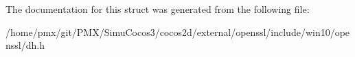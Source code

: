The documentation for this struct was generated from the following file\+:\begin{DoxyCompactItemize}
\item 
/home/pmx/git/\+P\+M\+X/\+Simu\+Cocos3/cocos2d/external/openssl/include/win10/openssl/dh.\+h\end{DoxyCompactItemize}
